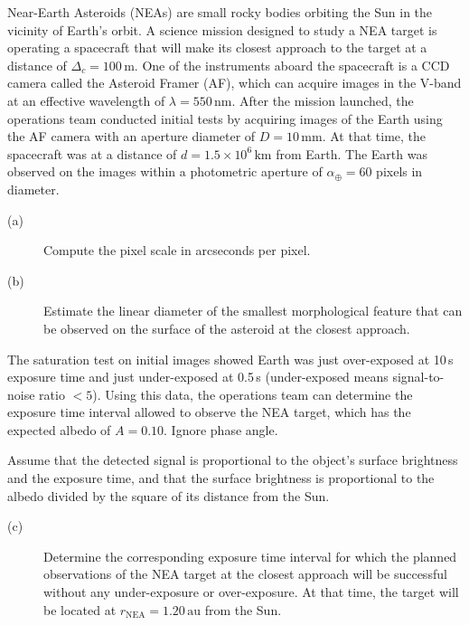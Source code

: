 Near-Earth Asteroids (NEAs) are small rocky bodies orbiting the Sun in the vicinity of Earth's orbit. A science mission designed to study a NEA target is operating a spacecraft that will make its closest approach to the target at a distance of $\Delta_c=100\,\mathrm m$. One of the instruments aboard the spacecraft is a CCD camera called the Asteroid Framer (AF), which can acquire images in the V-band at an effective wavelength of $\lambda=550\,\mathrm{nm}$. After the mission launched, the operations team conducted initial tests by acquiring images of the Earth using the AF camera with an aperture diameter of $D=10\,\mathrm{mm}$. At that time, the spacecraft was at a distance of $d=1.5\times10^6\,\mathrm{km}$ from Earth. The Earth was observed on the images within a photometric aperture of $\alpha_\oplus=60$ pixels in diameter.
\begin{description}
\item[(a)] Compute the pixel scale in arcseconds per pixel.
\item[(b)] Estimate the linear diameter of the smallest morphological feature that can be observed on the surface of the asteroid at the closest approach.
\end{description}
The saturation test on initial images showed Earth was just over-exposed at 10\,s exposure time and just under-exposed at 0.5\,s (under-exposed means signal-to-noise ratio $<5$). Using this data, the operations team can determine the exposure time interval allowed to observe the NEA target, which has the expected albedo of $A=0.10$. Ignore phase angle.

Assume that the detected signal is proportional to the object's surface brightness and the exposure time, and that the surface brightness is proportional to the albedo divided by the square of its distance from the Sun.
\begin{description}
\item[(c)] Determine the corresponding exposure time interval for which the planned observations of the NEA target at the closest approach will be successful without any under-exposure or over-exposure. At that time, the target will be located at $r_{\mathrm{NEA}}=1.20\,\mathrm{au}$ from the Sun.
\end{description}
